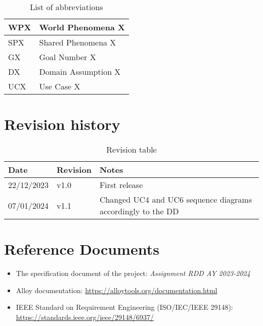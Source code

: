 \begin{table}[H]
  \begin{tabular}{|l|l|}

    \hline
    WPX & World Phenomena X    \\
    \hline
    SPX & Shared Phenomena X    \\
    \hline
    GX & Goal Number X    \\
    \hline
    DX & Domain Assumption X    \\
    \hline
    UCX & Use Case X    \\
    \hline

  \end{tabular}
  \caption{List of abbreviations}
  \label{tab:abbreviations}
\end{table}



\section{Revision history}
\label{s:Revision_history}%

  \begin{table}[H]
  \begin{tabular}{|l|l|l|}

    \hline
    Date & Revision & Notes    \\
    \hline
    22/12/2023 & v1.0 & First release    \\
    \hline
    07/01/2024 & v1.1 & Changed UC4 and UC6 sequence diagrams accordingly to the DD   \\
    \hline

  \end{tabular}
  \caption{Revision table}
  \label{tab:revision}
\end{table}


\section{Reference Documents}
\label{s:Reference_documents}%

\begin{itemize}
  \item The specification document of the project: \textit{Assignment RDD AY 2023-2024}
  \item Alloy documentation: \url{https://alloytools.org/documentation.html}
  \item IEEE Standard on Requirement Engineering (ISO/IEC/IEEE 29148): \url{https://standards.ieee.org/ieee/29148/6937/}
\end{itemize}
